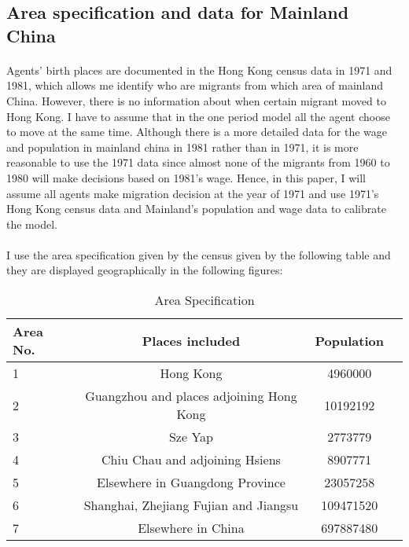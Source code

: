 \documentclass[12pt]{article}
\begin{document}
\bigskip
\subsection{Area specification and data for Mainland China}

\paragraph{}
Agents' birth places are documented in the Hong Kong census data in 1971 and 1981, which allows me identify who are migrants from which area of mainland China. However, there is no information about when certain migrant moved to Hong Kong. I have to assume that in the one period model all the agent choose to move at the same time. Although there is a more detailed data for the wage and population in mainland china in 1981 rather than in 1971, it is more reasonable to use the 1971 data since almost none of the migrants from 1960 to 1980 will make decisions based on 1981's wage. Hence, in this paper, I will assume all agents make migration decision at the year of 1971 and use 1971's Hong Kong census data and Mainland's population and wage data to calibrate the model.


\paragraph{}
I use the area specification given by the census given by the following table and they are displayed geographically in the following figures:
\begin{table}[H]
\caption{Area Specification \label{as}}
\begin{center}
\begin{tabular}{lccc}
\hline
\hline
Area No.& Places included & Population  \\
\hline
1&Hong Kong&4960000\\
2&Guangzhou and places adjoining Hong Kong&10192192\\
3&Sze Yap&2773779\\
4&Chiu Chau and adjoining Hsiens&8907771\\
5&Elsewhere in Guangdong Province&23057258\\
6&Shanghai, Zhejiang Fujian and Jiangsu&109471520\\
7&Elsewhere in China&697887480\\
\end{tabular}
\end{center}
\end{table}
\end{document}

